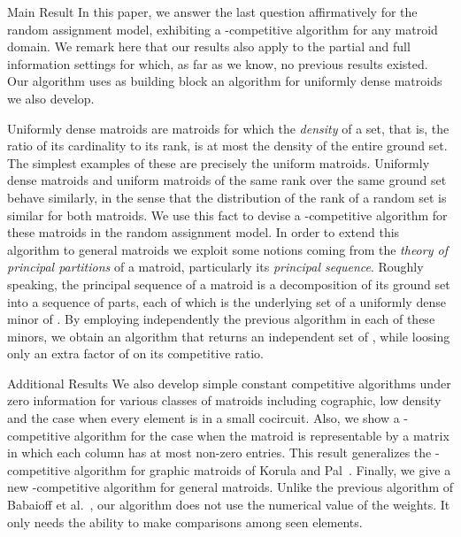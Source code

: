 \documentclass[letterpaper,11pt]{article}
\theoremstyle{definition}
\theoremstyle{remark}
\begin{document}
\begin{paragraph}{Main Result}
In this paper, we answer the last question affirmatively for the random assignment model, exhibiting a -competitive algorithm for any matroid domain. We remark here that our results also apply to the partial and full information settings for which, as far as we know, no previous results existed. Our algorithm uses as building block an algorithm for uniformly dense matroids we also develop.

Uniformly dense matroids are matroids for which the \emph{density} of a set, that is, the ratio of its cardinality to its rank, is at most the density of the entire ground set. The simplest examples of these are precisely the uniform matroids. Uniformly dense matroids and uniform matroids of the same rank over the same ground set behave similarly, in the sense that the distribution of the rank of a random set is similar for both matroids. We use this fact to devise a -competitive algorithm for these matroids in the random assignment model. In order to extend this algorithm to general matroids we exploit some notions coming from the \emph{theory of principal partitions} of a matroid, particularly its \emph{principal sequence}. Roughly speaking, the principal sequence of a matroid  is a decomposition of its ground set into a sequence of parts, each of which is the underlying set of a uniformly dense minor of . By employing independently the previous algorithm in each of these minors, we obtain an algorithm that returns an independent set of , while loosing only an extra factor of  on its competitive ratio.
\end{paragraph}

\begin{paragraph}{Additional Results}
We also develop simple constant competitive algorithms under zero information for various classes of matroids including cographic, low density and the case when every element is in a small cocircuit. Also, we show a -competitive algorithm for the case when the matroid is representable by a matrix in which each column has at most  non-zero entries. This result generalizes the -competitive algorithm for graphic matroids of Korula and Pal~\cite{korula2009algorithms}. Finally, we give a new -competitive algorithm for general matroids. Unlike the previous algorithm of Babaioff et al.~\cite{babaioff_matroids_2007}, our algorithm does not use the numerical value of the weights. It only needs the ability to make comparisons among seen elements.
\end{paragraph}
\end{document}
